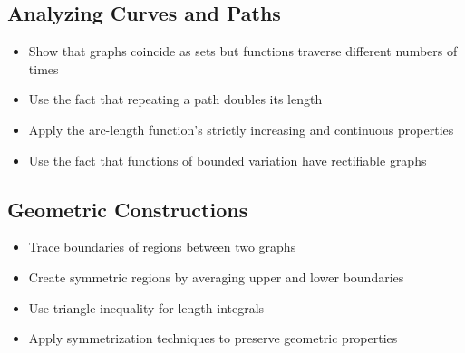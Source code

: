 \subsection*{Analyzing Curves and Paths}
\begin{itemize}
\item Show that graphs coincide as sets but functions traverse different numbers of times
\item Use the fact that repeating a path doubles its length
\item Apply the arc-length function's strictly increasing and continuous properties
\item Use the fact that functions of bounded variation have rectifiable graphs
\end{itemize}

\subsection*{Geometric Constructions}
\begin{itemize}
\item Trace boundaries of regions between two graphs
\item Create symmetric regions by averaging upper and lower boundaries
\item Use triangle inequality for length integrals
\item Apply symmetrization techniques to preserve geometric properties
\end{itemize}